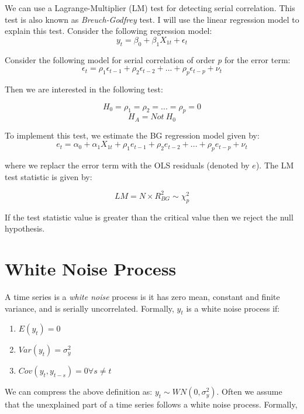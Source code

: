 \documentclass[]{book}
\providecommand{\tightlist}{%
  \setlength{\itemsep}{0pt}\setlength{\parskip}{0pt}}
\theoremstyle{definition}
\theoremstyle{definition}
\theoremstyle{definition}
\theoremstyle{remark}
\begin{document}
We can use a Lagrange-Multiplier (LM) test for detecting serial
correlation. This test is also known as \emph{Breuch-Godfrey} test. I
will use the linear regression model to explain this test. Consider the
following regression model: \begin{equation}
y_t=\beta_0 + \beta_1 X_{1t}+\epsilon_t
\end{equation}

Consider the following model for serial correlation of order \emph{p}
for the error term: \begin{equation}
\epsilon_t=\rho_1 \epsilon_{t-1}+\rho_2 \epsilon_{t-2}+...+ \rho_p \epsilon_{t-p}+\nu_t
\label{eq:bg}
\end{equation}

Then we are interested in the following test:

\[H_0=\rho_1=\rho_2=...=\rho_p=0 \] \[H_A = Not \ H_0 \]

To implement this test, we estimate the BG regression model given by:
\begin{equation}
e_t=\alpha_0 + \alpha_1 X_{1t}+ \rho_1 e_{t-1}+\rho_2 e_{t-2}+...+ \rho_p e_{t-p}+\nu_t
\label{eq:bg1}
\end{equation}

where we replacr the error term with the OLS residuals (denoted by
\(e\)). The LM test statistic is given by:

\[ LM  = N\times R^2_{BG}  \sim \chi^2_p  \]

If the test statistic value is greater than the critical value then we
reject the null hypothesis.

\hypertarget{white-noise-process}{%
\section{White Noise Process}\label{white-noise-process}}

A time series is a \emph{white noise} process is it has zero mean,
constant and finite variance, and is serially uncorrelated. Formally,
\(y_t\) is a white noise process if:

\begin{enumerate}
\def\labelenumi{\arabic{enumi}.}
\tightlist
\item
  \(E(y_t)=0\)
\item
  \(Var(y_t)=\sigma^2_y\)
\item
  \(Cov(y_t,y_{t-s})= 0 \forall s\neq t\)
\end{enumerate}

We can compress the above definition as: \(y_t\sim WN(0,\sigma^2_y)\).
Often we assume that the unexplained part of a time series follows a
white noise process. Formally,
\end{document}
